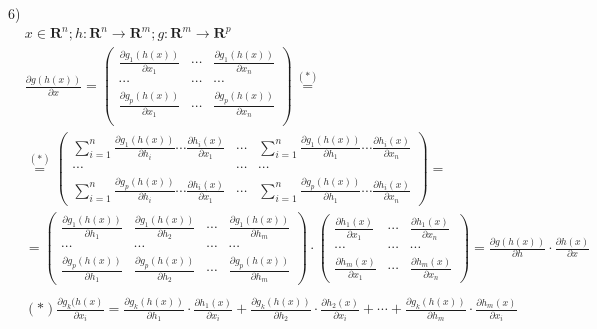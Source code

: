 \documentclass{report}
\begin{document}
\par 6)
\begin{align*}
& x \in \mathbf{R}^n; h: \mathbf{R}^n \rightarrow \mathbf{R}^m; g: \mathbf{R}^m \rightarrow \mathbf{R}^p \\
& \frac{\partial g(h(x))}{\partial x} = \begin{pmatrix}
    \frac{\partial g_1 (h(x))}{\partial x_1} & \cdots & \frac{\partial g_1 (h(x))}{\partial x_n} \\
    \cdots & \cdots & \cdots \\
    \frac{\partial g_p (h(x))}{\partial x_1} & \cdots & \frac{\partial g_p (h(x))}{\partial x_n} \\
\end{pmatrix} \overset{(*)}{=} \\
& \overset{(*)}{=} \begin{pmatrix}
    \sum_{i=1}^{n} \frac{\partial g_1 (h(x))}{\partial h_i} \cdots \frac{\partial h_i (x)}{\partial x_1} &
    \cdots &
    \sum_{i=1}^{n} \frac{\partial g_1 (h(x))}{\partial h_1} \cdots \frac{\partial h_i (x)}{\partial x_n} \\
    \cdots & \cdots & \cdots \\
    \sum_{i=1}^{n} \frac{\partial g_p (h(x))}{\partial h_i} \cdots \frac{\partial h_i (x)}{\partial x_1} &
    \cdots &
    \sum_{i=1}^{n} \frac{\partial g_p (h(x))}{\partial h_1} \cdots \frac{\partial h_i (x)}{\partial x_n}
\end{pmatrix} = \\
& = \begin{pmatrix}
    \frac{\partial g_1 (h(x))}{\partial h_1} & \frac{\partial g_1 (h(x))}{\partial h_2} & \cdots & \frac{\partial g_1 (h(x))}{\partial h_m} \\
    \cdots & \cdots & \cdots & \cdots \\
    \frac{\partial g_p (h(x))}{\partial h_1} & \frac{\partial g_p (h(x))}{\partial h_2} & \cdots & \frac{\partial g_p (h(x))}{\partial h_m}
\end{pmatrix} \cdot \begin{pmatrix}
    \frac{\partial h_1 (x)}{\partial x_1} & \cdots & \frac{\partial h_1 (x)}{\partial x_n} \\
    \cdots & \cdots & \cdots \\
    \frac{\partial h_m (x)}{\partial x_1} & \cdots & \frac{\partial h_m (x)}{\partial x_n}
\end{pmatrix} = \frac{\partial g(h(x))}{\partial h} \cdot \frac{\partial h(x)}{\partial x} \\ \\
& (*) \frac{\partial g_k (h(x)}{\partial x_i} =
    \frac{\partial g_k (h(x))}{\partial h_1} \cdot \frac{\partial h_1 (x)}{\partial x_i} +
    \frac{\partial g_k (h(x))}{\partial h_2} \cdot \frac{\partial h_2 (x)}{\partial x_i} +
    \cdots +
    \frac{\partial g_k (h(x))}{\partial h_m} \cdot \frac{\partial h_m (x)}{\partial x_i}
\end{align*}
\end{document}

